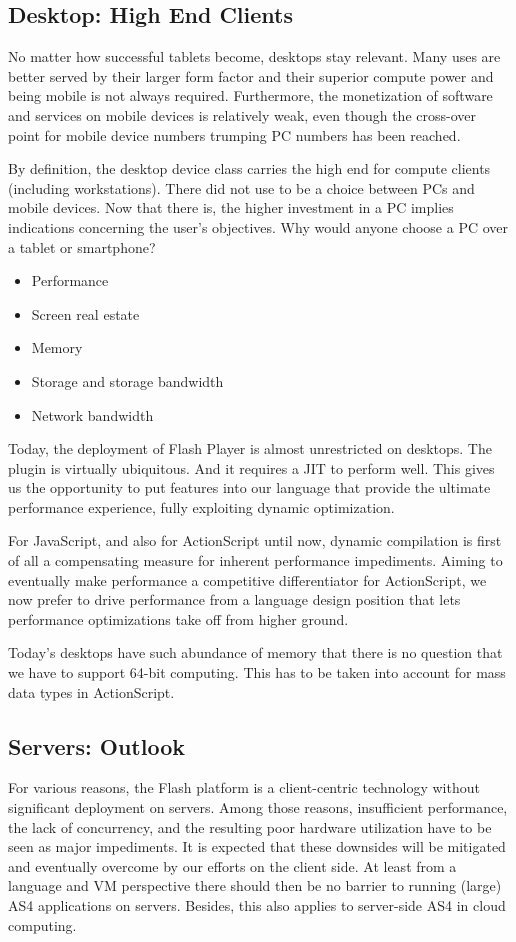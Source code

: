 \subsection{Desktop: High End Clients}
No matter how successful tablets become, desktops stay relevant. Many uses are
better served by their larger form factor and their superior compute power and
being mobile is not always required. Furthermore, the monetization of software
and services on mobile devices is relatively weak, even though the cross-over
point for mobile device numbers trumping PC numbers has been reached.

By definition, the desktop device class carries the high end for compute clients
(including workstations). There did not use to be a choice between PCs and
mobile devices. Now that there is, the higher investment in a PC implies
indications concerning the user's objectives. Why would anyone choose a PC over
a tablet or smartphone?
\begin{itemize}
  \item Performance
  \item Screen real estate
  \item Memory
  \item Storage and storage bandwidth
  \item Network bandwidth
\end{itemize}

Today, the deployment of Flash Player is almost unrestricted on desktops. The
plugin is virtually ubiquitous. And it requires a JIT to perform well. This
gives us the opportunity to put features into our language that provide the
ultimate performance experience, fully exploiting dynamic optimization.

For JavaScript, and also for ActionScript until now, dynamic compilation is
first of all a compensating measure for inherent performance impediments.
Aiming to eventually make performance a competitive differentiator for
ActionScript, we now prefer to drive performance from a language design position
that lets performance optimizations take off from higher ground.

Today's desktops have such abundance of memory that there is no question that we
have to support 64-bit computing. This has to be taken into account for mass
data types in ActionScript.

\subsection{Servers: Outlook}
For various reasons, the Flash platform is a client-centric technology without
significant deployment on servers. Among those reasons, insufficient performance, the lack
of concurrency, and the resulting poor hardware utilization have to be seen as
major impediments. It is expected that these downsides will be mitigated and
eventually overcome by our efforts on the client side. At least from a language
and VM perspective there should then be no barrier to running (large) AS4
applications on servers. Besides, this also applies to server-side AS4
in cloud computing.

